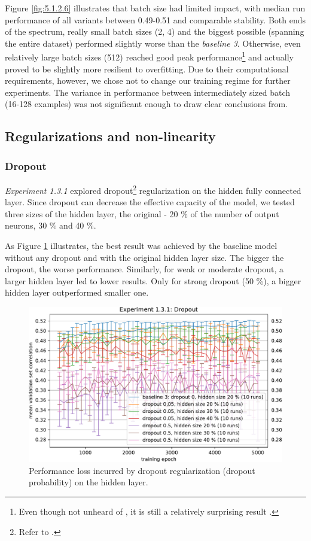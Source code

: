 Figure \ref{fig:5.1.2.6} illustrates that batch size had limited impact, with median run performance of all variants between 0.49-0.51 and comparable stability. Both ends of the spectrum, really small batch sizes (2, 4) and the biggest possible (spanning the entire dataset) performed slightly worse than the \textit{baseline 3}. Otherwise, even relatively large batch sizes (512) reached good peak performance\footnote{Even though not unheard of \citep{2017arXiv171100489S}, it is still a relatively surprising result \citep{2017arXiv170508741H}.} and actually proved to be slightly more resilient to overfitting. Due to their computational requirements, however, we chose not to change our training regime for further experiments. The variance in performance between intermediately sized batch (16-128 examples) was not significant enough to draw clear conclusions from.

\subsection{Regularizations and non-linearity}
\subsubsection{Dropout}

\textit{Experiment 1.3.1} explored dropout\footnote{Refer to .} regularization on the hidden fully connected layer. Since dropout can decrease the effective capacity of the model, we tested three sizes of the hidden layer, the original - 20 \% of the number of output neurons, 30 \% and 40 \%. 

As Figure \ref{fig:5.1.3.1} illustrates, the best result was achieved by the baseline model without any dropout and with the original hidden layer size. The bigger the dropout, the worse performance. Similarly, for weak or moderate dropout, a larger hidden layer led to lower results. Only for strong dropout (50 \%), a bigger hidden layer outperformed smaller one.

\begin{figure}[H]
    \centering
    \includegraphics[width=1\textwidth]{../figures/05_1_3_1}
    \caption[Experiment 1.3.1]{Performance loss incurred by dropout regularization (dropout probability) on the hidden layer.}
    \label{fig:5.1.3.1}
\end{figure}

